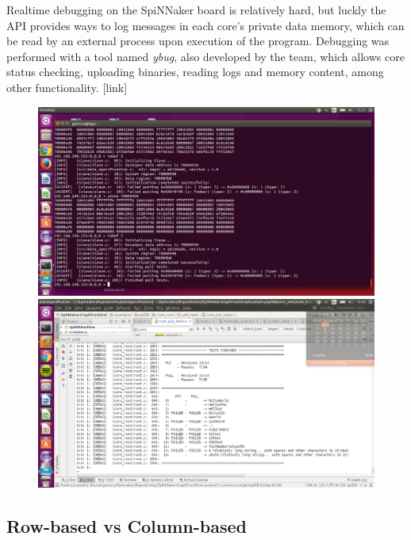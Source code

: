 Realtime debugging on the SpiNNaker board is relatively hard, but luckly the API provides ways to log messages in each core's private data memory, which can be read by an external process upon execution of the program. Debugging was performed with a tool named \textit{ybug}, also developed by the team, which allows core status checking, uploading binaries, reading logs and memory content, among other functionality.\cite{ybug} [link]

\begin{figure}
  \centering
  \includegraphics[width=1.3\linewidth, natwidth=1366, natheight=768]{images/debugging.png}
  \label{fig:debugging}
  \centering
  \includegraphics[width=1.3\linewidth, natwidth=1366, natheight=768]{images/testing.png}
  \label{fig:testing}
\end{figure}



\subsection{Row-based vs Column-based}

